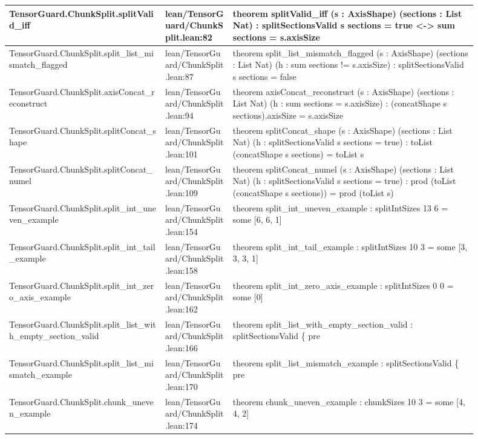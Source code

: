 \documentclass[10pt]{article}
\begin{document}
\begin{longtable}{|p{0.30\linewidth}|p{0.13\linewidth}|p{0.47\linewidth}|}
\hline
TensorGuard.ChunkSplit.splitValid\_iff & lean/TensorGuard/ChunkSplit.lean:82 & theorem splitValid\_iff (s : AxisShape) (sections : List Nat) : splitSectionsValid s sections = true <-> sum sections = s.axisSize \\
\hline
TensorGuard.ChunkSplit.split\_list\_mismatch\_flagged & lean/TensorGuard/ChunkSplit.lean:87 & theorem split\_list\_mismatch\_flagged (s : AxisShape) (sections : List Nat) (h : sum sections != s.axisSize) : splitSectionsValid s sections = false \\
\hline
TensorGuard.ChunkSplit.axisConcat\_reconstruct & lean/TensorGuard/ChunkSplit.lean:94 & theorem axisConcat\_reconstruct (s : AxisShape) (sections : List Nat) (h : sum sections = s.axisSize) : (concatShape s sections).axisSize = s.axisSize \\
\hline
TensorGuard.ChunkSplit.splitConcat\_shape & lean/TensorGuard/ChunkSplit.lean:101 & theorem splitConcat\_shape (s : AxisShape) (sections : List Nat) (h : splitSectionsValid s sections = true) : toList (concatShape s sections) = toList s \\
\hline
TensorGuard.ChunkSplit.splitConcat\_numel & lean/TensorGuard/ChunkSplit.lean:109 & theorem splitConcat\_numel (s : AxisShape) (sections : List Nat) (h : splitSectionsValid s sections = true) : prod (toList (concatShape s sections)) = prod (toList s) \\
\hline
TensorGuard.ChunkSplit.split\_int\_uneven\_example & lean/TensorGuard/ChunkSplit.lean:154 & theorem split\_int\_uneven\_example : splitIntSizes 13 6 = some [6, 6, 1] \\
\hline
TensorGuard.ChunkSplit.split\_int\_tail\_example & lean/TensorGuard/ChunkSplit.lean:158 & theorem split\_int\_tail\_example : splitIntSizes 10 3 = some [3, 3, 3, 1] \\
\hline
TensorGuard.ChunkSplit.split\_int\_zero\_axis\_example & lean/TensorGuard/ChunkSplit.lean:162 & theorem split\_int\_zero\_axis\_example : splitIntSizes 0 0 = some [0] \\
\hline
TensorGuard.ChunkSplit.split\_list\_with\_empty\_section\_valid & lean/TensorGuard/ChunkSplit.lean:166 & theorem split\_list\_with\_empty\_section\_valid : splitSectionsValid \{ pre \\
\hline
TensorGuard.ChunkSplit.split\_list\_mismatch\_example & lean/TensorGuard/ChunkSplit.lean:170 & theorem split\_list\_mismatch\_example : splitSectionsValid \{ pre \\
\hline
TensorGuard.ChunkSplit.chunk\_uneven\_example & lean/TensorGuard/ChunkSplit.lean:174 & theorem chunk\_uneven\_example : chunkSizes 10 3 = some [4, 4, 2] \\

\end{longtable}
\end{document}

